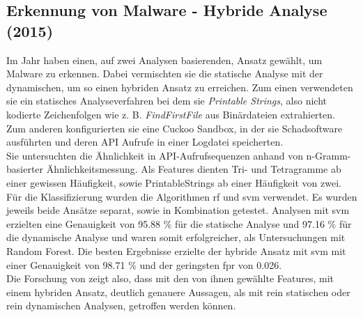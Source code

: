 \documentclass[
    12pt, %
    DIV10,
    ngerman, %
    a4paper, %
    oneside, %
    titlepage, %
    parskip=half, %
    headings=normal, %
    listof=totoc, %
    bibliography=totoc, %
    index=totoc, %
    captions=tableheading, %
    final %
]{scrreprt}
\begin{document}
\subsection{Erkennung von Malware - Hybride Analyse (2015)}
Im Jahr \citeyear{Shijo2015} haben \textcite{Shijo2015} einen, auf zwei Analysen basierenden, Ansatz gewählt, um Malware zu erkennen. Dabei vermischten sie die statische Analyse mit der dynamischen, um so einen hybriden Ansatz zu erreichen. Zum einen verwendeten sie ein statisches Analyseverfahren bei dem sie \emph{Printable Strings}, also nicht kodierte Zeichenfolgen wie z. B. \emph{FindFirstFile} aus Binärdateien extrahierten. Zum anderen konfigurierten sie eine Cuckoo Sandbox, in der sie Schadsoftware ausführten und deren API Aufrufe in einer Logdatei speicherten.\\
Sie untersuchten die Ähnlichkeit in API-Aufrufsequenzen anhand von n-Gramm-basierter Ähnlichkeitsmessung. 
Als Features dienten Tri- und Tetragramme ab einer gewissen Häufigkeit, sowie PrintableStrings ab einer Häufigkeit von zwei.
Für die Klassifizierung wurden die Algorithmen \ac{rf} und \ac{svm} verwendet.
Es wurden jeweils beide Ansätze separat, sowie in Kombination getestet. Analysen mit \ac{svm} erzielten eine Genauigkeit von 95.88 \% für die statische Analyse und 97.16 \% für die dynamische Analyse und waren somit erfolgreicher, als Untersuchungen mit Random Forest. Die besten Ergebnisse erzielte der hybride Ansatz mit \ac{svm} mit einer Genauigkeit von 98.71 \% und der geringsten \ac{fpr} von 0.026.\\
Die Forschung von \textcite{Shijo2015} zeigt also, dass mit den von ihnen gewählte Features, mit einem hybriden Ansatz, deutlich genauere Aussagen, als mit rein statischen oder rein dynamischen Analysen, getroffen werden können.

%
\end{document}
